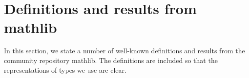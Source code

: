 \chapter{Definitions and results from mathlib}

In this section, we state a number of well-known definitions and results from the community repository mathlib.
The definitions are included so that the representations of types we use are clear.





